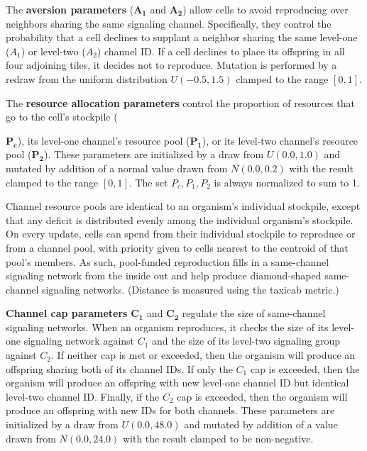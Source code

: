 The \textbf{aversion parameters} ($\bm{A_1}$ and $\bm{A_2}$) allow cells to avoid reproducing over neighbors sharing the same signaling channel.
Specifically, they control the probability that a cell declines to supplant a neighbor sharing the same level-one ($A_1$) or level-two ($A_2$) channel ID.
If a cell declines to place its offspring in all four adjoining tiles, it decides not to reproduce.
Mutation is performed by a redraw from the uniform distribution $U(-0.5,1.5)$ clamped to the range $[0,1]$.

The \textbf{resource allocation parameters} control the proportion of resources that go to the cell's stockpile ({$\bm{P_{c}}$), its level-one channel's resource pool ($\bm{P_1}$), or its level-two channel's resource pool ($\bm{P_2}$).
These parameters are initialized by a draw from $U(0.0, 1.0)$ and mutated by addition of a normal value drawn from $N(0.0,0.2)$ with the result clamped to the range $[0,1]$.
The set $P_{c}, P_1, P_2$ is always normalized to sum to 1.

Channel resource pools are identical to an organism's individual stockpile, except that any deficit is distributed evenly among the individual organism's stockpile.
On every update, cells can spend from their individual stockpile to reproduce or from a channel pool, with priority given to cells nearest to the centroid of that pool's members.
As such, pool-funded reproduction fills in a same-channel signaling network from the inside out and help produce diamond-shaped same-channel signaling networks.
(Distance is measured using the taxicab metric.)

\textbf{Channel cap parameters} $\bm{C_1}$ and $\bm{C_2}$ regulate the size of same-channel signaling networks.
When an organism reproduces, it checks the size of its level-one signaling network against $C_1$ and the size of its level-two signaling group against $C_2$.
If neither cap is met or exceeded, then the organism will produce an offspring sharing both of its channel IDs.
If only the $C_1$ cap is exceeded, then the organism will produce an offspring with new level-one channel ID but identical level-two channel ID.
Finally, if the $C_2$ cap is exceeded, then the organism will produce an offspring with new IDs for both channels.
These parameters are initialized by a draw from $U(0.0, 48.0)$ and mutated by addition of a value drawn from $N(0.0,24.0)$ with the result clamped to be non-negative.

}

